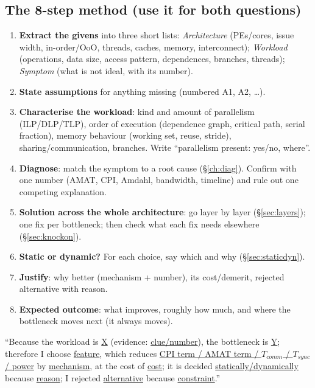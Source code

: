 \subsection{The 8-step method (use it for both questions)}\label{sec:8step}
\begin{enumerate}[leftmargin=*]
\item \textbf{Extract the givens} into three short lists: \emph{Architecture} (PEs/cores, issue width, in-order/OoO, threads, caches, memory, interconnect); \emph{Workload} (operations, data size, access pattern, dependences, branches, threads); \emph{Symptom} (what is not ideal, with its number).
\item \textbf{State assumptions} for anything missing (numbered A1, A2, \ldots).
\item \textbf{Characterise the workload}: kind and amount of parallelism (ILP/DLP/TLP), order of execution (dependence graph, critical path, serial fraction), memory behaviour (working set, reuse, stride), sharing/communication, branches. Write ``parallelism present: yes/no, where''.
\item \textbf{Diagnose}: match the symptom to a root cause (\S\ref{ch:diag}). Confirm with one number (AMAT, CPI, Amdahl, bandwidth, timeline) and rule out one competing explanation.
\item \textbf{Solution across the whole architecture}: go layer by layer (\S\ref{sec:layers}); one fix per bottleneck; then check what each fix needs elsewhere (\S\ref{sec:knockon}).
\item \textbf{Static or dynamic?} For each choice, say which and why (\S\ref{sec:staticdyn}).
\item \textbf{Justify}: why better (mechanism + number), its cost/demerit, rejected alternative with reason.
\item \textbf{Expected outcome}: what improves, roughly how much, and where the bottleneck moves next (it always moves).
\end{enumerate}

\begin{key}
``Because the workload is \underline{X} (evidence: \underline{clue/number}), the bottleneck is \underline{Y}; therefore I choose \underline{feature}, which reduces \underline{CPI term / AMAT term / $T_{comm}$ / $T_{sync}$ / power} by \underline{mechanism}, at the cost of \underline{cost}; it is decided \underline{statically/dynamically} because \underline{reason}; I rejected \underline{alternative} because \underline{constraint}.''
\end{key}

